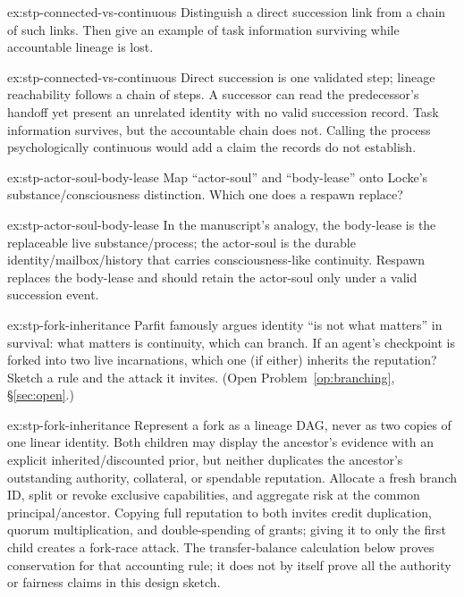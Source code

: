 \documentclass[11pt,a4paper]{article}
\theoremstyle{definition}
\begin{document}

\begin{pdexercise}[kind=Check,rating=1]{ex:stp-connected-vs-continuous}
Distinguish a direct succession link from a chain of such links. Then give
an example of task information surviving while accountable lineage is lost.
\end{pdexercise}
\begin{pdsolution}{ex:stp-connected-vs-continuous}
Direct succession is one validated step; lineage reachability follows a
chain of steps. A successor can read the predecessor's handoff yet present
an unrelated identity with no valid succession record. Task information
survives, but the accountable chain does not. Calling the process
psychologically continuous would add a claim the records do not establish.
\end{pdsolution}
\begin{pdexercise}[kind=Trace,rating=2]{ex:stp-actor-soul-body-lease}
Map ``actor-soul'' and ``body-lease'' onto Locke's substance/consciousness
distinction. Which one does a respawn replace?
\end{pdexercise}
\begin{pdsolution}{ex:stp-actor-soul-body-lease}
In the manuscript's analogy, the body-lease is the replaceable live
substance/process; the actor-soul is the durable identity/mailbox/history that
carries consciousness-like continuity. Respawn replaces the body-lease and
should retain the actor-soul only under a valid succession event.
\end{pdsolution}
\begin{pdexercise}[kind=Open,rating=3]{ex:stp-fork-inheritance}
Parfit famously argues identity ``is not what matters'' in survival: what
matters is continuity, which can branch. If an agent's checkpoint is forked
into two live incarnations, which one (if either) inherits the reputation?
Sketch a rule and the attack it invites. (Open Problem~\ref{op:branching},
\S\ref{sec:open}.)
\end{pdexercise}
\begin{pdsolution}{ex:stp-fork-inheritance}
Represent a fork as a lineage DAG, never as two copies of one linear identity.
Both children may display the ancestor's evidence with an explicit
inherited/discounted prior, but neither duplicates the ancestor's outstanding
authority, collateral, or spendable reputation. Allocate a fresh branch ID,
split or revoke exclusive capabilities, and aggregate risk at the common
principal/ancestor. Copying full reputation to both invites credit
duplication, quorum multiplication, and double-spending of grants; giving it
to only the first child creates a fork-race attack. The transfer-balance
calculation below proves conservation for that accounting rule; it does not
by itself prove all the authority or fairness claims in this design sketch.
\end{pdsolution}
\end{document}
